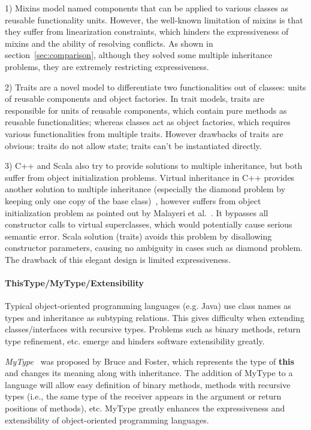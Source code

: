 1) Mixins model named components that can be applied to various classes as
reusable functionality units. However, the well-known limitation of mixins is
that they suffer from linearization constraints, which hinders the
expressiveness of mixins and the ability of resolving conflicts.  As shown in
section~\ref{sec:comparison}, although they solved some multiple inheritance
problems, they are extremely restricting expressiveness. 

2) Traits are a novel model to differentiate two functionalities out of classes:
units of reusable components and object factories. In trait models, traits are
responsible for units of reusable components, which contain pure methods as
reusable functionalities; whereas classes act as object factories, which
requires various functionalities from multiple traits. However drawbacks of
traits are obvious: traits do not allow state; traits can't be instantiated
directly.

3) C++ and Scala also try to provide solutions to multiple inheritance, but both
suffer from object initialization problems. Virtual inheritance in C++ provides
another solution to multiple inheritance (especially the diamond problem by
keeping only one copy of the base class)~\cite{ellis1990annotated}, however
suffers from object initialization problem as pointed out by Malayeri et
al.~\cite{malayeri2009cz}. It bypasses all constructor calls to virtual
superclasses, which would potentially cause serious semantic error. Scala
solution (traits) avoids this problem by disallowing constructor parameters,
causing no ambiguity in cases such as diamond problem. The drawback of this
elegant design is limited expressiveness. 

\paragraph{ThisType/MyType/Extensibility}
Typical object-oriented programming languages (e.g. Java) use class names as
types and inheritance as subtyping relations. This gives difficulty when
extending classes/interfaces with recursive types. Problems such as binary
methods, return type refinement, etc. emerge and hinders software extensibility
greatly.

\emph{MyType}~\cite{bruce1994paradigmatic} was proposed by Bruce and Foster,
which represents the type of \textbf{this} and changes its meaning along with
inheritance. The addition of MyType to a language will allow easy definition of
binary methods, methods with recursive types (i.e., the same type of the
receiver appears in the argument or return positions of methods), etc. MyType
greatly enhances the expressiveness and extensibility of object-oriented
programming languages. 

